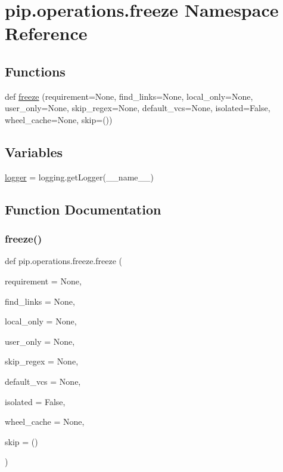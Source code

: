 \hypertarget{namespacepip_1_1operations_1_1freeze}{}\section{pip.\+operations.\+freeze Namespace Reference}
\label{namespacepip_1_1operations_1_1freeze}
\subsection*{Functions}
\begin{DoxyCompactItemize}
\item 
def \hyperlink{namespacepip_1_1operations_1_1freeze_ab0567eb140bc0923d49a9981791593f0}{freeze} (requirement=None, find\+\_\+links=None, local\+\_\+only=None, user\+\_\+only=None, skip\+\_\+regex=None, default\+\_\+vcs=None, isolated=False, wheel\+\_\+cache=None, skip=())
\end{DoxyCompactItemize}
\subsection*{Variables}
\begin{DoxyCompactItemize}
\item 
\hyperlink{namespacepip_1_1operations_1_1freeze_a767bb7d5eb0d07a97482e6a086e70d42}{logger} = logging.\+get\+Logger(\+\_\+\+\_\+name\+\_\+\+\_\+)
\end{DoxyCompactItemize}


\subsection{Function Documentation}
\mbox{\label{namespacepip_1_1operations_1_1freeze_ab0567eb140bc0923d49a9981791593f0}} 
\subsubsection{\texorpdfstring{freeze()}{freeze()}}
{\footnotesize\ttfamily def pip.\+operations.\+freeze.\+freeze (\begin{DoxyParamCaption}\item[{}]{requirement = {\ttfamily None},  }\item[{}]{find\+\_\+links = {\ttfamily None},  }\item[{}]{local\+\_\+only = {\ttfamily None},  }\item[{}]{user\+\_\+only = {\ttfamily None},  }\item[{}]{skip\+\_\+regex = {\ttfamily None},  }\item[{}]{default\+\_\+vcs = {\ttfamily None},  }\item[{}]{isolated = {\ttfamily False},  }\item[{}]{wheel\+\_\+cache = {\ttfamily None},  }\item[{}]{skip = {\ttfamily ()} }\end{DoxyParamCaption})}



